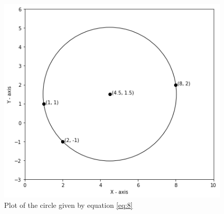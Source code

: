 \documentclass[journal,12pt,twocolumn]{IEEEtran}
\begin{document}
\begin{figure}[h]
\centering
    \includegraphics[width=\columnwidth]{circle2.png}
    \caption{Plot of the circle given by equation \eqref{eq:8}}
    \label{circle}
\end{figure}
\end{document}
